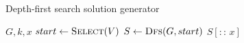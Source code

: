 \begin{algorithm}[h]
  \caption{Depth-first search solution generator}\label{alg:DFS-SMART-INIT}
  \begin{algorithmic}[1]
    \Require $G, k, x$
    \State $start \leftarrow \Call{Select}{V}$
    \State $S \leftarrow \Call{Dfs}{G, start}$
    \State \Return $S\left[ {::}\,x \right]$
  \end{algorithmic}
\end{algorithm}
